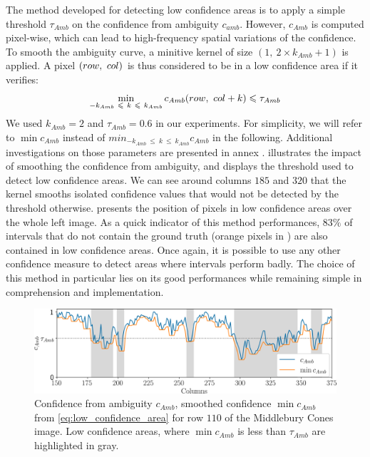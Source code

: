 The method developed for detecting low confidence areas is to apply a simple threshold $\tau_{Amb}$ on the confidence from ambiguity $c_{amb}$. However, $c_{Amb}$ is computed pixel-wise, which can lead to high-frequency spatial variations of the confidence. To smooth the ambiguity curve, a minitive kernel of size $(1, ~2\times k_{Amb}+1)$ is applied. A pixel $(row, ~col)$ is thus considered to be in a low confidence area if it verifies:
\begin{align}\label{eq:low_confidence_area}
    \min_{-k_{Amb}~\leqslant~ k~\leqslant ~k_{Amb}}c_{Amb}(row, ~col+k)\leqslant \tau_{Amb}
\end{align}
We used $k_{Amb}=2$ and $\tau_{Amb}=0.6$ in our experiments. For simplicity, we will refer to $\min c_{Amb}$ instead of $min_{-k_{Amb}~\leqslant~ k~\leqslant ~k_{Amb}}c_{Amb}$ in the following. Additional investigations on those parameters are presented in annex .  illustrates the impact of smoothing the confidence from ambiguity, and displays the threshold used to detect low confidence areas. We can see around columns $185$ and $320$ that the kernel smooths isolated confidence values that would not be detected by the threshold otherwise.  presents the position of pixels in low confidence areas over the whole left image. As a quick indicator of this method performances, $83\%$ of intervals that do not contain the ground truth (orange pixels in ) are also contained in low confidence areas. Once again, it is possible to use any other confidence measure to detect areas where intervals perform badly. The choice of this method in particular lies on its good performances while remaining simple in comprehension and implementation.

\begin{figure}
    \centering
    \includegraphics[width=\linewidth]{Images/Chap_5/ambiguity_kernel_row_110.png}
    \caption{Confidence from ambiguity $c_{Amb}$, smoothed confidence $\min c_{Amb}$ from \eqref{eq:low_confidence_area} for row $110$ of the Middlebury Cones image. Low confidence areas, where $\min c_{Amb}$ is less than $\tau_{Amb}$ are highlighted in gray.}
    \label{fig:ambiguity_kernel}
\end{figure}

